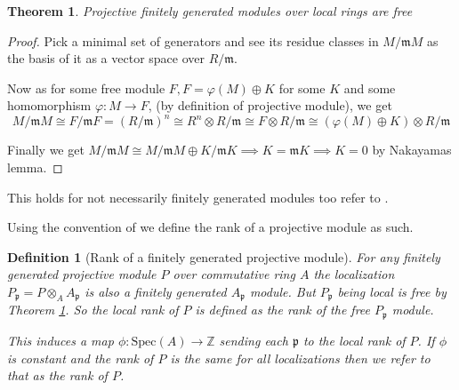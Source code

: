 \documentclass[12pt]{report}
\numberwithin{equation}{section}
\newcommand{\Z}{\mathbb{Z}}
\newcounter{dummy} \numberwithin{dummy}{section}
\newtheorem{theorem}[dummy]{Theorem}
\newtheorem{definition}[dummy]{Definition}
\begin{document}
	\begin{theorem}\label{a2}Projective finitely generated modules over local rings are free
	\end{theorem}
	\begin{proof}
		Pick a minimal set of generators and see its residue classes in $M/\mathfrak{m}M$ as the basis of it as a vector space over $R/\mathfrak{m}$.
		
		Now as for some free module $F, F=\varphi(M)\oplus K$ for some $K$ and some homomorphism $\varphi: M \to F$, (by definition of projective module), 	we get \[ M/\mathfrak{m}M \cong 	F/\mathfrak{m}F = (R/\mathfrak{m})^n\cong R^n\otimes R/\mathfrak{m} \cong F \otimes R/\mathfrak{m} \cong (\varphi(M)\oplus K) \otimes R/\mathfrak{m}\]
		
		Finally we get $M/\mathfrak{m}M \cong M/\mathfrak{m}M \oplus K/\mathfrak{m}K\implies K=\mathfrak{m}K \implies K=0$ by Nakayamas lemma.
	\end{proof}
	This holds for not necessarily finitely generated modules too refer to \cite[Theorem~2.5]{matsumura_1987}	.
	
	Using the convention of \cite{lam1999lectures} we define the rank of a projective module as such.
	\begin{definition}[Rank of a finitely generated projective module]\label{def:rankproj}
		For any finitely generated projective module $P$ over commutative ring $A$ the localization $P_\mathfrak{p} =P \otimes_A A_\mathfrak{p}$ is also a finitely generated $A_\mathfrak{p}$ module. But $P_\mathfrak{p}$ being local is free by Theorem \ref{a2}. So the local rank of $P$ is defined as the rank of the free $P_\mathfrak{p} $ module.
		
		This induces a map $\phi: \mathrm{Spec}(A) \to \Z $ sending each $\mathfrak{p}$ to the local rank of $P$. If $\phi $ is constant and the rank of $P$ is the same for all localizations then we refer to that as the rank of $P$.
	\end{definition}
	
\end{document}
